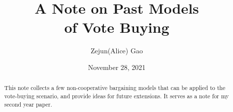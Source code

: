 \documentclass[ProjectGAZ]{subfiles}
\begin{document}
\providecommand{\versn}{pdf} %
\ifthenelse{\boolean{Web}}{    %
  \renewcommand{\versn}{Web}     %
  \renewcommand{\rootFromOut}{.} %
}{}  %


\title{A Note on Past Models \\ of Vote Buying}

\author{Zejun(Alice) Gao}



\renewcommand{\forcedate}{November 28, 2021}\date{\forcedate}

\maketitle
\hypertarget{abstract}{}
\begin{abstract}
This note collects a few non-cooperative bargaining models that can be applied to the vote-buying scenario, and provide ideas for future extensions. It serves as a note for my second year paper.  
\end{abstract}



\end{document}
